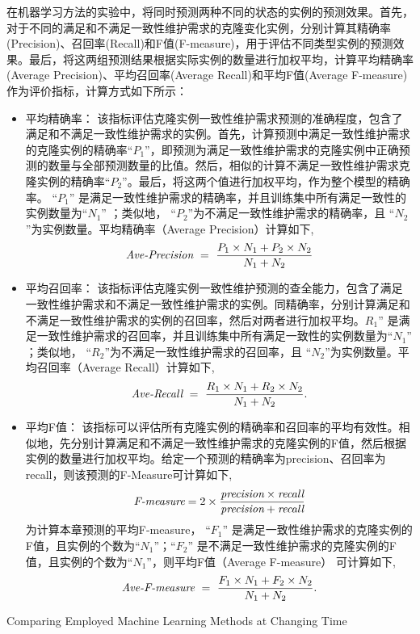 在机器学习方法的实验中，将同时预测两种不同的状态的实例的预测效果。首先，对于不同的满足和不满足一致性维护需求的克隆变化实例，分别计算其精确率(Precision)、召回率(Recall)和F值(F-measure)，用于评估不同类型实例的预测效果。最后，将这两组预测结果根据实际实例的数量进行加权平均，计算平均精确率(Average Precision)、平均召回率(Average Recall)和平均F值(Average F-measure)作为评价指标，计算方式如下所示：

\begin{itemize}
\item
{平均精确率：} 该指标评估克隆实例一致性维护需求预测的准确程度，包含了满足和不满足一致性维护需求的实例。首先，计算预测中满足一致性维护需求的克隆实例的精确率``$P_1$''，即预测为满足一致性维护需求的克隆实例中正确预测的数量与全部预测数量的比值。然后，相似的计算不满足一致性维护需求克隆实例的精确率``$P_2$''。最后，将这两个值进行加权平均，作为整个模型的精确率。 ``$P_1$'' 是满足一致性维护需求的精确率，并且训练集中所有满足一致性的实例数量为``$N_1$'' ；类似地， ``$P_2$''为不满足一致性维护需求的精确率，且 ``$N_2$''为实例数量。平均精确率（Average Precision）计算如下,
\[
\mbox{\it Ave-Precision} ~=~ {\frac {P_1 \times N_1 + P_2 \times N_2}{N_1 + N_2}}
\]
\item
{平均召回率：} 该指标评估克隆实例一致性维护预测的查全能力，包含了满足一致性维护需求和不满足一致性维护需求的实例。同精确率，分别计算满足和不满足一致性维护需求的实例的召回率，然后对两者进行加权平均。$R_1$'' 是满足一致性维护需求的召回率，并且训练集中所有满足一致性的实例数量为``$N_1$'' ；类似地， ``$R_2$''为不满足一致性维护需求的召回率，且 ``$N_2$''为实例数量。平均召回率（Average Recall）计算如下,
\[
\mbox{\it Ave-Recall} ~=~ {\frac  {R_1 \times N_1 + R_2 \times N_2}{N_1 + N_2}}.
\]

\item
{平均F值：} 该指标可以评估所有克隆实例的精确率和召回率的平均有效性。相似地，先分别计算满足和不满足一致性维护需求的克隆实例的F值，然后根据实例的数量进行加权平均。给定一个预测的精确率为precision、召回率为 recall，则该预测的F-Measure可计算如下,
\[  
\mbox{\it F-measure} =2 \times {\frac {\mbox{\it precision} \times \mbox{\it recall} }{ \mbox{\it precision} + \mbox{\it recall} } }
\]
为计算本章预测的平均F-measure， ``$F_1$'' 是满足一致性维护需求的克隆实例的F值，且实例的个数为``$N_1$''；``$F_2$'' 是不满足一致性维护需求的克隆实例的F值，且实例的个数为``$N_1$''，则平均F值（Average F-measure） 可计算如下,
\[
\mbox{\it Ave-F-measure} ~=~ {\frac  {F_1 \times N_1 + F_2 \times N_2}{N_1 + N_2}}.
\]
\end{itemize}

{Comparing Employed Machine Learning Methods at Changing Time}


